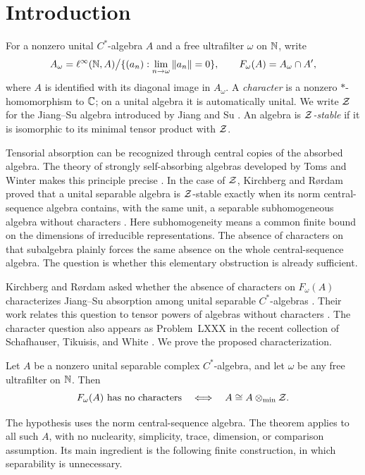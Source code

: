 \section{Introduction}\label{sec:introduction}

For a nonzero unital $C^*$-algebra $A$ and a free ultrafilter $\omega$ on
$\mathbb N$, write
\[
 A_\omega=\ell^\infty(\mathbb N,A)\big/
 \{(a_n):\lim_{n\to\omega}\|a_n\|=0\},
 \qquad F_\omega(A)=A_\omega\cap A',
\]
where $A$ is identified with its diagonal image in $A_\omega$. A
\emph{character} is a nonzero $*$-homomorphism to $\mathbb C$; on a unital algebra
it is automatically unital. We write $\mathcal Z$ for the Jiang--Su algebra
introduced by Jiang and Su \cite{JS}. An algebra is \emph{$\mathcal Z$-stable}
if it is isomorphic to its minimal tensor product with $\mathcal Z$.

Tensorial absorption can be recognized through central copies of the
absorbed algebra. The theory of strongly self-absorbing algebras developed
by Toms and Winter makes this principle precise \cite{TW}. In the case
of $\mathcal Z$, Kirchberg and R\o rdam proved that a unital separable algebra
is $\mathcal Z$-stable exactly when its norm central-sequence algebra contains,
with the same unit, a separable subhomogeneous algebra without characters
\cite[Theorem~2.5]{KR}. Here subhomogeneity means a common finite bound
on the dimensions of irreducible representations. The absence of
characters on that subalgebra plainly forces the same absence on the
whole central-sequence algebra. The question is whether this elementary
obstruction is already sufficient.

Kirchberg and R\o rdam asked whether the absence of characters on
$F_\omega(A)$ characterizes Jiang--Su absorption among unital separable
$C^*$-algebras \cite[Question~3.1]{KR}. Their work relates this question to
tensor powers of algebras without characters
\cite[Question~3.7 and Proposition~3.9]{KR}. The character question also
appears as Problem~LXXX in the recent collection of
Schafhauser, Tikuisis, and White \cite[Section~22]{STW}. We prove the
proposed characterization.

\begin{theorem}\label{thm:main}
Let $A$ be a nonzero unital separable complex $C^*$-algebra, and let
$\omega$ be any free ultrafilter on $\mathbb N$. Then
\[
 F_\omega(A)\text{ has no characters}
 \quad\Longleftrightarrow\quad A\cong A\otimes_{\min}\mathcal Z.
\]
\end{theorem}

The hypothesis uses the norm central-sequence algebra. The theorem applies
to all such $A$, with no nuclearity, simplicity, trace, dimension, or
comparison assumption. Its main ingredient is the following finite
construction, in which separability is unnecessary.

